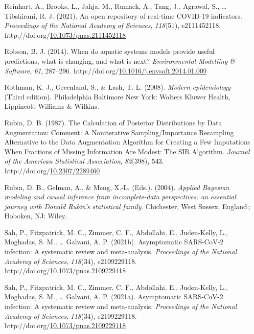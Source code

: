 \documentclass[12pt,twoside]{smiththesis}
\newlength{\cslhangindent}
\newenvironment{CSLReferences}[2] %
 {%
\setlength{\parindent}{0pt}
\ifodd #1 \everypar{\setlength{\hangindent}{\cslhangindent}}\ignorespaces\fi
\ifnum #2 > 0
\setlength{\parskip}{#2\baselineskip}
  \fi
}%
{}
\begin{document}
\begin{CSLReferences}{1}{0}
\leavevmode{}%
Reinhart, A., Brooks, L., Jahja, M., Rumack, A., Tang, J., Agrawal, S., \ldots{} Tibshirani, R. J. (2021). An open repository of real-time COVID-19 indicators. \emph{Proceedings of the National Academy of Sciences}, \emph{118}(51), e2111452118. http://doi.org/\href{https://doi.org/10.1073/pnas.2111452118}{10.1073/pnas.2111452118}

\leavevmode{}%
Robson, B. J. (2014). When do aquatic systems models provide useful predictions, what is changing, and what is next? \emph{Environmental Modelling \& Software}, \emph{61}, 287--296. http://doi.org/\href{https://doi.org/10.1016/j.envsoft.2014.01.009}{10.1016/j.envsoft.2014.01.009}

\leavevmode{}%
Rothman, K. J., Greenland, S., \& Lash, T. L. (2008). \emph{Modern epidemiology} (Third edition). Philadelphia Baltimore New York: Wolters Kluwer Health, Lippincott Williams \& Wilkins.

\leavevmode{}%
Rubin, D. B. (1987). The Calculation of Posterior Distributions by Data Augmentation: Comment: A Noniterative Sampling/Importance Resampling Alternative to the Data Augmentation Algorithm for Creating a Few Imputations When Fractions of Missing Information Are Modest: The SIR Algorithm. \emph{Journal of the American Statistical Association}, \emph{82}(398), 543. http://doi.org/\href{https://doi.org/10.2307/2289460}{10.2307/2289460}

\leavevmode{}%
Rubin, D. B., Gelman, A., \& Meng, X.-L. (Eds.). (2004). \emph{Applied Bayesian modeling and causal inference from incomplete-data perspectives: an essential journey with Donald Rubin's statistical family}. Chichester, West Sussex, England\,; Hoboken, NJ: Wiley.

\leavevmode{}%
Sah, P., Fitzpatrick, M. C., Zimmer, C. F., Abdollahi, E., Juden-Kelly, L., Moghadas, S. M., \ldots{} Galvani, A. P. (2021b). Asymptomatic SARS-CoV-2 infection: A systematic review and meta-analysis. \emph{Proceedings of the National Academy of Sciences}, \emph{118}(34), e2109229118. http://doi.org/\href{https://doi.org/10.1073/pnas.2109229118}{10.1073/pnas.2109229118}

\leavevmode{}%
Sah, P., Fitzpatrick, M. C., Zimmer, C. F., Abdollahi, E., Juden-Kelly, L., Moghadas, S. M., \ldots{} Galvani, A. P. (2021a). Asymptomatic SARS-CoV-2 infection: A systematic review and meta-analysis. \emph{Proceedings of the National Academy of Sciences}, \emph{118}(34), e2109229118. http://doi.org/\href{https://doi.org/10.1073/pnas.2109229118}{10.1073/pnas.2109229118}


\end{CSLReferences}
\end{document}
